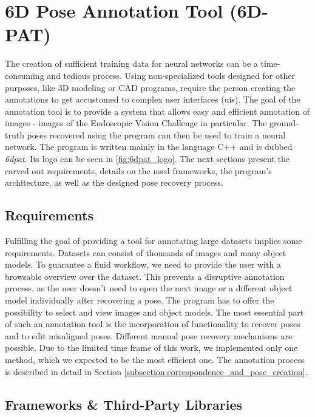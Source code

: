 \section{6D Pose Annotation Tool (6D-PAT)}

The creation of sufficient training data for neural networks can be a time-consuming and tedious process. Using non-specialized tools designed for other purposes, like 3D modeling or CAD programs, require the person creating the annotations to get accustomed to complex user interfaces (\acp{ui}). The goal of the annotation tool is to provide a system that allows easy and efficient annotation of images - images of the Endoscopic Vision Challenge in particular. The ground-truth poses recovered using the program can then be used to train a neural network. The program is written mainly in the language C++ and is dubbed \textit{\acf{6dpat}}. Its logo can be seen in \fig \ref{fig:6dpat_logo}. The next sections present the carved out requirements, details on the used frameworks, the program's architecture, as well as the designed pose recovery process.

\subsection{Requirements}

Fulfilling the goal of providing a tool for annotating large datasets implies some requirements. Datasets can consist of thousands of images and many object models. To guarantee a fluid workflow, we need to provide the user with a browsable overview over the dataset. This prevents a disruptive annotation process, as the user doesn't need to open the next image or a different object model individually after recovering a pose. The program has to offer the possibility to select and view images and object models. The most essential part of such an annotation tool is the incorporation of functionality to recover poses and to edit misaligned poses. Different manual pose recovery mechanisms are possible. Due to the limited time frame of this work, we implemented only one method, which we expected to be the most efficient one. The annotation process is described in detail in Section \ref{subsection:correspondence_and_pose_creation}.

\subsection{Frameworks \& Third-Party Libraries}

